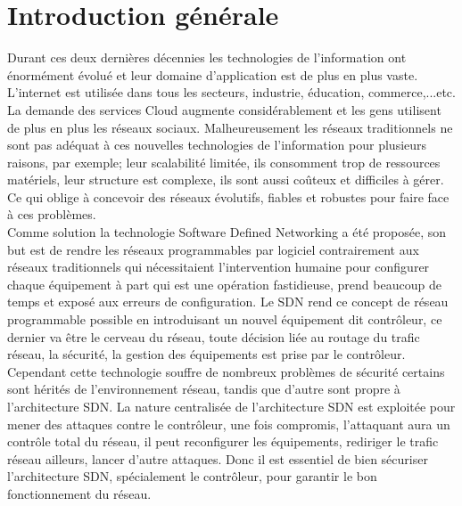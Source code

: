 
\chapter{Introduction générale} 

\label{Introduction} 
Durant ces deux dernières décennies les technologies de l’information ont  énormément évolué et leur domaine d’application est de plus en plus vaste. L’internet est utilisée dans tous les secteurs, industrie, éducation, commerce,...etc. La demande des services Cloud augmente considérablement et les gens utilisent de plus en plus les réseaux sociaux. Malheureusement les réseaux traditionnels ne sont pas adéquat à ces nouvelles technologies de l’information  pour plusieurs raisons, par exemple; leur scalabilité limitée, ils consomment trop de ressources matériels,  leur structure est complexe, ils sont aussi coûteux et difficiles à gérer.  Ce qui oblige à concevoir des réseaux évolutifs, fiables et robustes pour faire face à ces problèmes.\\

	Comme solution la technologie Software Defined Networking a été proposée, son but est de rendre les réseaux programmables par logiciel contrairement aux réseaux traditionnels qui nécessitaient l’intervention humaine  pour configurer chaque équipement à part qui est une opération fastidieuse, prend beaucoup de temps et exposé aux erreurs de configuration. Le SDN rend ce concept de réseau programmable possible en introduisant un nouvel équipement dit contrôleur, ce dernier va être le cerveau du réseau, toute décision liée au routage du trafic réseau, la sécurité, la gestion des équipements est prise par le contrôleur.\\
	
	Cependant cette technologie souffre de nombreux problèmes de sécurité certains sont hérités de l’environnement réseau, tandis que d’autre sont propre à l’architecture SDN. La nature centralisée de l’architecture SDN est exploitée pour mener des attaques contre le contrôleur, une fois compromis, l’attaquant aura un contrôle total du réseau, il peut reconfigurer les équipements, rediriger le trafic réseau ailleurs, lancer d’autre attaques. Donc il est essentiel de bien sécuriser l'architecture SDN, spécialement le contrôleur, pour garantir le bon fonctionnement du réseau.\\
	
